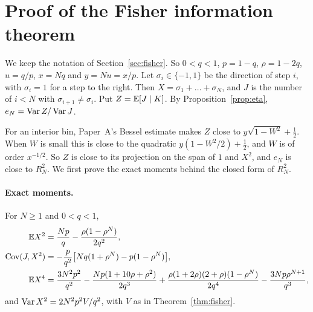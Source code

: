 \section{Proof of the Fisher information theorem}\label{app:fisher}

We keep the notation of Section~\ref{sec:fisher}. So $0<q<1$, $p=1-q$,
$\rho=1-2q$, $u=q/p$, $x=Nq$ and $y=Nu=x/p$. Let $\sigma_i\in\{-1,1\}$ be the
direction of step $i$, with $\sigma_i=1$ for a step to the right. Then
$X=\sigma_1+\dots+\sigma_N$, and $J$ is the number of $i<N$ with
$\sigma_{i+1}\ne\sigma_i$. Put $Z=\mathbb{E}[J\mid K]$. By
Proposition~\ref{prop:eta}, $e_N=\operatorname{Var} Z/\operatorname{Var} J$.

For an interior bin, Paper~A's Bessel estimate makes $Z$ close to
$y\sqrt{1-W^2}+\frac12$. When $W$ is small this is close to the quadratic
$y(1-W^2/2)+\frac12$, and $W$ is of order $x^{-1/2}$. So $Z$ is close to its
projection on the span of $1$ and $X^2$, and $e_N$ is close to $R^2_N$. We
first prove the exact moments behind the closed form of $R^2_N$.

\paragraph{Exact moments.}

\begin{lemma}\label{lem:fisher-moments}
For $N\ge1$ and $0<q<1$,
\begin{align*}
 \mathbb{E} X^2&=\frac{Np}q-\frac{\rho(1-\rho^N)}{2q^2},\\
 \operatorname{Cov}(J,X^2)&=-\frac p{q^2}\bigl[Nq(1+\rho^N)-p(1-\rho^N)\bigr],\\
 \mathbb{E} X^4&=\frac{3N^2p^2}{q^2}-\frac{Np(1+10\rho+\rho^2)}{2q^3}
 +\frac{\rho(1+2\rho)(2+\rho)(1-\rho^N)}{2q^4}
 -\frac{3Np\rho^{N+1}}{q^3},
\end{align*}
and $\operatorname{Var} X^2=2N^2p^2V/q^2$, with $V$ as in Theorem~\ref{thm:fisher}.
\end{lemma}

